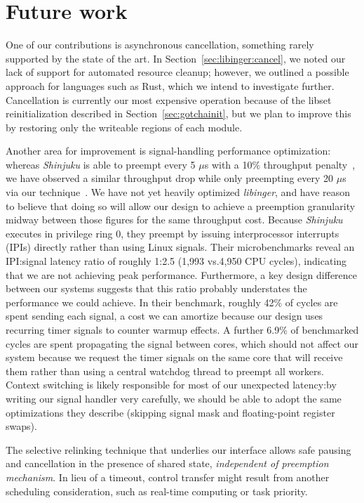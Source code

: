 \section{Future work}

One of our contributions is asynchronous cancellation, something rarely supported by
the state of the art.  In Section~\ref{sec:libinger:cancel}, we noted our lack of
support for automated resource cleanup; however, we outlined a possible approach for
languages such as Rust, which we intend to investigate further.  Cancellation is
currently
our most expensive operation because of the libset reinitialization described in
Section~\ref{sec:gotchainit}, but we plan to improve this by restoring only the
writeable regions of each module.

Another area for improvement is signal-handling performance optimization: whereas
\textit{Shinjuku} is able to preempt every 5 $\mu$s with a 10\% throughput
penalty~\cite{Kaffes:nsdi2019}, we have observed a similar throughput drop while only
preempting every 20 $\mu$s via our technique~\cite{boucher:atc2018}.  We have not yet
heavily optimized \textit{libinger}, and have reason to believe that doing so will
allow our design to achieve a preemption granularity midway between those figures
for the same throughput cost.  Because \textit{Shinjuku} executes in privilege ring
0, they preempt by issuing interprocessor interrupts (IPIs) directly rather than
using Linux signals.  Their microbenchmarks reveal an IPI:signal latency ratio of
roughly 1:2.5 (1,993 vs.\@ 4,950 CPU cycles), indicating that we are not achieving
peak performance.  Furthermore, a key design difference between our systems suggests
that this ratio probably understates the performance we could achieve.  In their
benchmark, roughly 42\% of cycles are spent sending each signal, a cost we can
amortize because our design uses recurring timer signals to counter warmup effects.
A further 6.9\% of benchmarked cycles are spent propagating the signal between cores,
which should not affect our system because we request the timer signals on the same
core that will receive them rather than using a central watchdog thread to preempt
all workers.  Context switching is likely responsible for most of our unexpected
latency:\@ by writing our signal handler very carefully, we should be able to adopt
the same optimizations they describe (skipping signal mask and floating-point
register swaps).

The selective relinking technique that underlies our interface allows safe pausing
and cancellation in the presence of shared state, \textit{independent of preemption
mechanism}.  In lieu of a timeout,
control transfer might result from another scheduling consideration, such as
real-time computing or task priority.

